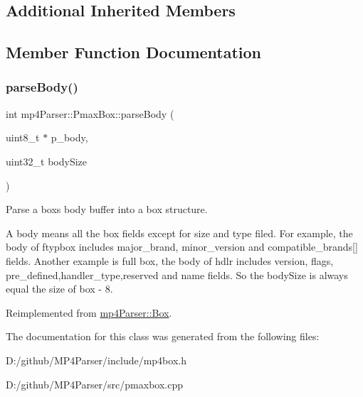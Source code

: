 \subsection*{Additional Inherited Members}


\subsection{Member Function Documentation}
\mbox{\label{classmp4_parser_1_1_pmax_box_a0a5929ce9d30eb5a3c840c8321f133cd}} 
\subsubsection{\texorpdfstring{parseBody()}{parseBody()}}
{\footnotesize\ttfamily int mp4\+Parser\+::\+Pmax\+Box\+::parse\+Body (\begin{DoxyParamCaption}\item[{uint8\+\_\+t $\ast$}]{p\+\_\+body,  }\item[{uint32\+\_\+t}]{body\+Size }\end{DoxyParamCaption})\hspace{0.3cm}{\ttfamily [virtual]}}



Parse a box\textquotesingle{}s body buffer into a box structure. 

A body means all the box fields except for size and type filed. For example, the body of ftypbox includes major\+\_\+brand, minor\+\_\+version and compatible\+\_\+brands\mbox{[}\mbox{]} fields. Another example is full box, the body of hdlr includes version, flags, pre\+\_\+defined,handler\+\_\+type,reserved and name fields. So the body\+Size is always equal the size of box -\/ 8. 

Reimplemented from \mbox{\hyperlink{classmp4_parser_1_1_box_a3dd0c084ac65bc77b69ac5ecaf796cb2}{mp4\+Parser\+::\+Box}}.



The documentation for this class was generated from the following files\+:\begin{DoxyCompactItemize}
\item 
D\+:/github/\+M\+P4\+Parser/include/mp4box.\+h\item 
D\+:/github/\+M\+P4\+Parser/src/pmaxbox.\+cpp\end{DoxyCompactItemize}

